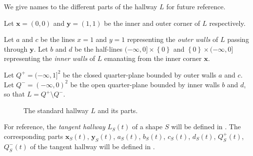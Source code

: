 We give names to the different parts of the hallway \(L\) for future reference.

\begin{definition}

Let \(\mathbf{x} = (0, 0)\) and \(\mathbf{y} = (1, 1)\) be the inner and outer corner of \(L\) respectively.

\label{def:hallway-corners}
\end{definition}

\begin{definition}

Let \(a\) and \(c\) be the lines \(x=1\) and \(y=1\) representing the \emph{outer walls} of \(L\) passing through \(\mathbf{y}\). Let \(b\) and \(d\) be the half-lines \((-\infty, 0] \times \left\{ 0 \right\}\) and \(\left\{ 0 \right\} \times (-\infty, 0]\) representing the \emph{inner walls} of \(L\) emanating from the inner corner \(\mathbf{x}\).

\label{def:hallway-walls}
\end{definition}

\begin{definition}

Let \(Q^+ = (-\infty, 1]^2\) be the closed quarter-plane bounded by outer walls \(a\) and \(c\). Let \(Q^- = (-\infty, 0)^2\) be the open quarter-plane bounded by inner walls \(b\) and \(d\), so that \(L = Q^+ \setminus Q^-\).

\label{def:hallway-regions}
\end{definition}

\begin{figure}
\centering

\caption{The standard hallway \(L\) and its parts.}
\label{fig:hallway-detailed}
\end{figure}

For reference, the \emph{tangent hallway} \(L_S(t)\) of a shape \(S\) will be defined in . The corresponding parts \(\mathbf{x}_S(t)\), \(\mathbf{y}_S(t)\), \(a_S(t)\), \(b_S(t)\), \(c_S(t)\), \(d_S(t)\), \(Q^+_S(t)\), \(Q^-_S(t)\) of the tangent hallway will be defined in .